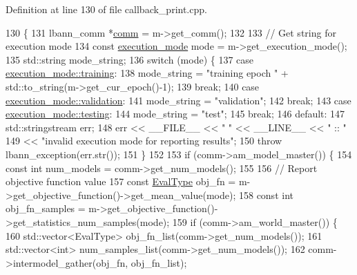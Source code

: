 Definition at line 130 of file callback\+\_\+print.\+cpp.


\begin{DoxyCode}
130                                                   \{
131   lbann\_comm *\hyperlink{file__io_8cpp_ab048c6f9fcbcfaa57ce68b00263dbebe}{comm} = m->get\_comm();
132 
133   \textcolor{comment}{// Get string for execution mode}
134   \textcolor{keyword}{const} \hyperlink{base_8hpp_a2781a159088df64ed7d47cc91c4dc0a8}{execution\_mode} mode = m->get\_execution\_mode();
135   std::string mode\_string;
136   \textcolor{keywordflow}{switch} (mode) \{
137   \textcolor{keywordflow}{case} \hyperlink{base_8hpp_a2781a159088df64ed7d47cc91c4dc0a8ac185ddac8b5a8f5aa23c5b80bc12d214}{execution\_mode::training}:
138     mode\_string = \textcolor{stringliteral}{"training epoch "} + std::to\_string(m->get\_cur\_epoch()-1);
139     \textcolor{keywordflow}{break};
140   \textcolor{keywordflow}{case} \hyperlink{base_8hpp_a2781a159088df64ed7d47cc91c4dc0a8aa617908b172c473cb8e8cda059e55bf0}{execution\_mode::validation}:
141     mode\_string = \textcolor{stringliteral}{"validation"};
142     \textcolor{keywordflow}{break};
143   \textcolor{keywordflow}{case} \hyperlink{base_8hpp_a2781a159088df64ed7d47cc91c4dc0a8aae2b1fca515949e5d54fb22b8ed95575}{execution\_mode::testing}:
144     mode\_string = \textcolor{stringliteral}{"test"};
145     \textcolor{keywordflow}{break};
146   \textcolor{keywordflow}{default}:
147     std::stringstream err;
148     err << \_\_FILE\_\_ << \textcolor{stringliteral}{" "} << \_\_LINE\_\_ << \textcolor{stringliteral}{" :: "}
149         << \textcolor{stringliteral}{"invalid execution mode for reporting results"};
150     \textcolor{keywordflow}{throw} lbann\_exception(err.str());
151   \}
152 
153   \textcolor{keywordflow}{if} (comm->am\_model\_master()) \{
154     \textcolor{keyword}{const} \textcolor{keywordtype}{int} num\_models = comm->get\_num\_models();
155     
156     \textcolor{comment}{// Report objective function value}
157     \textcolor{keyword}{const} \hyperlink{base_8hpp_a3266f5ac18504bbadea983c109566867}{EvalType} obj\_fn = m->get\_objective\_function()->get\_mean\_value(mode);
158     \textcolor{keyword}{const} \textcolor{keywordtype}{int} obj\_fn\_samples = m->get\_objective\_function()->get\_statistics\_num\_samples(mode);
159     \textcolor{keywordflow}{if} (comm->am\_world\_master()) \{
160       std::vector<EvalType> obj\_fn\_list(comm->get\_num\_models());
161       std::vector<int> num\_samples\_list(comm->get\_num\_models());
162       comm->intermodel\_gather(obj\_fn, obj\_fn\_list);

\end{DoxyCode}
